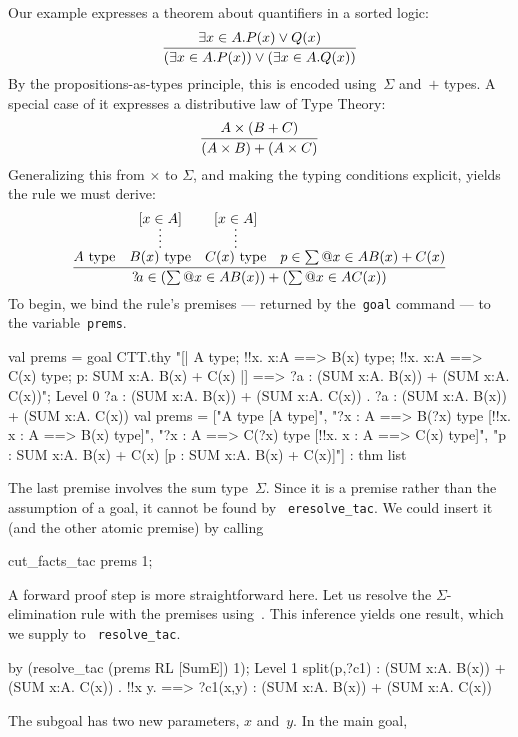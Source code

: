 Our example expresses a theorem about quantifiers in a sorted logic:
\[ \infer{(\ex{x\in A}P(x)) \disj (\ex{x\in A}Q(x))}
         {\ex{x\in A}P(x)\disj Q(x)} 
\]
By the propositions-as-types principle, this is encoded
using~$\Sigma$ and~$+$ types.  A special case of it expresses a
distributive law of Type Theory: 
\[ \infer{(A\times B) + (A\times C)}{A\times(B+C)} \]
Generalizing this from $\times$ to $\Sigma$, and making the typing
conditions explicit, yields the rule we must derive:
\[ \infer{\Var{a} \in (\sum@{x\in A} B(x)) + (\sum@{x\in A} C(x))}
         {\hbox{$A$ type} &
          \infer*{\hbox{$B(x)$ type}}{[x\in A]}  &
          \infer*{\hbox{$C(x)$ type}}{[x\in A]}  &
          p\in \sum@{x\in A} B(x)+C(x)} 
\]
To begin, we bind the rule's premises --- returned by the~{\tt goal}
command --- to the {\ML} variable~{\tt prems}.
\begin{ttbox}
val prems = goal CTT.thy
    "[| A type;                       \ttback
\ttback       !!x. x:A ==> B(x) type;       \ttback
\ttback       !!x. x:A ==> C(x) type;       \ttback
\ttback       p: SUM x:A. B(x) + C(x)       \ttback
\ttback    |] ==>  ?a : (SUM x:A. B(x)) + (SUM x:A. C(x))";
{\out Level 0}
{\out ?a : (SUM x:A. B(x)) + (SUM x:A. C(x))}
{. ?a : (SUM x:A. B(x)) + (SUM x:A. C(x))}
\ttbreak
{\out val prems = ["A type  [A type]",}
{\out              "?x : A ==> B(?x) type  [!!x. x : A ==> B(x) type]",}
{\out              "?x : A ==> C(?x) type  [!!x. x : A ==> C(x) type]",}
{\out              "p : SUM x:A. B(x) + C(x)  [p : SUM x:A. B(x) + C(x)]"]}
{\out             : thm list}
\end{ttbox}
The last premise involves the sum type~$\Sigma$.  Since it is a premise
rather than the assumption of a goal, it cannot be found by {\tt
  eresolve_tac}.  We could insert it (and the other atomic premise) by
calling
\begin{ttbox}
cut_facts_tac prems 1;
\end{ttbox}
A forward proof step is more straightforward here.  Let us resolve the
$\Sigma$-elimination rule with the premises using~.  This
inference yields one result, which we supply to {\tt
  resolve_tac}.
\begin{ttbox}
by (resolve_tac (prems RL [SumE]) 1);
{\out Level 1}
{\out split(p,?c1) : (SUM x:A. B(x)) + (SUM x:A. C(x))}
{. !!x y.}
{\out        [| x : A; y : B(x) + C(x) |] ==>}
{\out        ?c1(x,y) : (SUM x:A. B(x)) + (SUM x:A. C(x))}
\end{ttbox}
The subgoal has two new parameters, $x$ and~$y$.  In the main goal,
